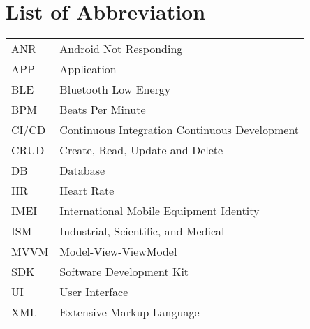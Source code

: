 \chapter{List of Abbreviation}

\begin{longtable}{p{} p{}}
    ANR & Android Not Responding \\
    APP & Application \\
    BLE & Bluetooth Low Energy \\
    BPM & Beats Per Minute \\
    CI/CD & Continuous Integration Continuous Development \\
    CRUD & Create, Read, Update and Delete \\
    DB & Database \\
    HR & Heart Rate \\
    IMEI & International Mobile Equipment Identity \\
    ISM & Industrial, Scientific, and Medical \\
    MVVM & Model-View-ViewModel \\
    SDK & Software Development Kit \\
    UI & User Interface \\
    XML & Extensive Markup Language \\

\end{longtable}